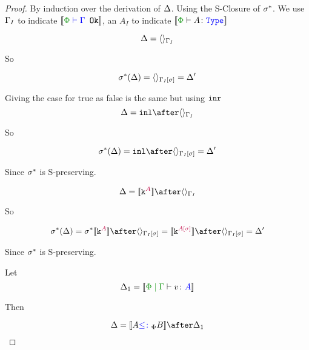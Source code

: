 \documentclass{report}
\begin{document}
\begin{framed}
    \begin{proof}
        
    By induction over the derivation of $\Delta$. Using the S-Closure of $\sigma^*$. We use $\Gamma_I$ to indicate $\deno{\wellformedok{\P}{\G}}$, an $A_I$ to indicate $\deno{\typerelation{\P}{A}{\type}}$
    
    \case{\vunit}
    
    \begin{equation}
        \Delta = \langle\rangle_{\Gamma_I}
    \end{equation}
    
    So
    
    \begin{equation}
        \sigma^*(\Delta) = \langle\rangle_{\Gamma_I[\sigma]} = \Delta'
    \end{equation}
    
    \case{\vtrue, \vfalse}
    Giving the case for true as false is the same but using $\texttt{inr}$
    \begin{equation}
        \D = \inl\after\term{\G_I}
    \end{equation}
    
    So
    
    \begin{equation}
        \si\star(\D) = \inl\after \term{\G_I\ssi} = \D'
    \end{equation}
    
    Since $\sigma^*$ is S-preserving.
    
    \case{\vconst}
    
    \begin{equation}
        \D = \deno{\const{A}}\after\term{\G_I}
    \end{equation}
    
    So
    
    \begin{equation}
        \si\star(\D) = \si\star\deno{\const{A}}\after \term{\G_I\ssi}=\deno{\const{A\ssi}}\after \term{\G_I\ssi}  = \D'
    \end{equation}
    
    Since $\sigma^*$ is S-preserving.
    
    \case{\vsubtype}
    
    Let \begin{equation}
        \D_1 = \deno{\gpetyperelation{v}{A}}
    \end{equation}
    
    Then
    
    \begin{equation}
        \D = \deno{A\subtypep B}\after \D_1\\
    \end{equation}
    

\end{proof}
\end{framed}
\end{document}
